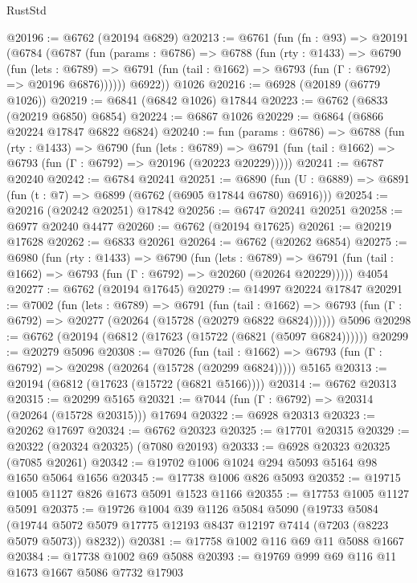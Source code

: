 \begin{lexlean}{RustStd}
\begin{coremodule}
@20196 := @6762 (@20194 @6829)
@20213 := @6761
    (fun (fn : @93) =>
    @20191
      (@6784
        (@6787
          (fun (params : @6786) =>
          @6788
            (fun (rty : @1433) =>
            @6790
              (fun (lets : @6789) =>
              @6791 (fun (tail : @1662) => @6793 (fun (Γ : @6792) => @20196 @6876))))))
        @6922))
    @1026
@20216 := @6928 (@20189 (@6779 @1026))
@20219 := @6841 (@6842 @1026) @17844
@20223 := @6762 (@6833 (@20219 @6850) @6854)
@20224 := @6867 @1026
@20229 := @6864 (@6866 @20224 @17847 @6822 @6824)
@20240 := fun (params : @6786) =>
  @6788
    (fun (rty : @1433) =>
    @6790
      (fun (lets : @6789) =>
      @6791 (fun (tail : @1662) => @6793 (fun (Γ : @6792) => @20196 (@20223 @20229)))))
@20241 := @6787 @20240
@20242 := @6784 @20241
@20251 := @6890
    (fun (U : @6889) => @6891 (fun (t : @7) => @6899 (@6762 (@6905 @17844 @6780) @6916)))
@20254 := @20216 (@20242 @20251) @17842
@20256 := @6747 @20241 @20251
@20258 := @6977 @20240 @4477
@20260 := @6762 (@20194 @17625)
@20261 := @20219 @17628
@20262 := @6833 @20261
@20264 := @6762 (@20262 @6854)
@20275 := @6980
    (fun (rty : @1433) =>
    @6790
      (fun (lets : @6789) =>
      @6791 (fun (tail : @1662) => @6793 (fun (Γ : @6792) => @20260 (@20264 @20229)))))
    @4054
@20277 := @6762 (@20194 @17645)
@20279 := @14997 @20224 @17847
@20291 := @7002
    (fun (lets : @6789) =>
    @6791
      (fun (tail : @1662) =>
      @6793 (fun (Γ : @6792) => @20277 (@20264 (@15728 (@20279 @6822 @6824))))))
    @5096
@20298 := @6762 (@20194 (@6812 (@17623 (@15722 (@6821 (@5097 @6824))))))
@20299 := @20279 @5096
@20308 := @7026
    (fun (tail : @1662) => @6793 (fun (Γ : @6792) => @20298 (@20264 (@15728 (@20299 @6824)))))
    @5165
@20313 := @20194 (@6812 (@17623 (@15722 (@6821 @5166))))
@20314 := @6762 @20313
@20315 := @20299 @5165
@20321 := @7044 (fun (Γ : @6792) => @20314 (@20264 (@15728 @20315))) @17694
@20322 := @6928 @20313
@20323 := @20262 @17697
@20324 := @6762 @20323
@20325 := @17701 @20315
@20329 := @20322 (@20324 @20325) (@7080 @20193)
@20333 := @6928 @20323 @20325 (@7085 @20261)
@20342 := @19702 @1006 @1024 @294 @5093 @5164 @98 @1650 @5064 @1656
@20345 := @17738 @1006 @826 @5093
@20352 := @19715 @1005 @1127 @826 @1673 @5091 @1523 @1166
@20355 := @17753 @1005 @1127 @5091
@20375 := @19726
    @1004
    @39
    @1126
    @5084
    @5090
    (@19733
      @5084
      (@19744 @5072 @5079 @17775 @12193 @8437 @12197 @7414 (@7203 (@8223 @5079 @5073)) @8232))
@20381 := @17758 @1002 @116 @69 @11 @5088 @1667
@20384 := @17738 @1002 @69 @5088
@20393 := @19769 @999 @69 @116 @11 @1673 @1667 @5086 @7732 @17903

\end{coremodule}
\end{lexlean}
